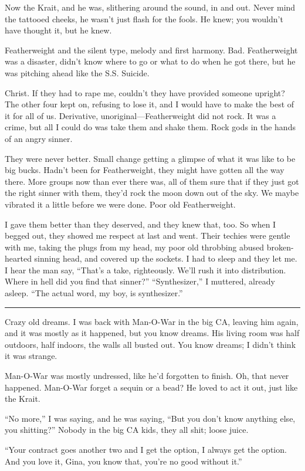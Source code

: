 Now the Krait, and he was, slithering around the sound, in and out. Never mind the tattooed cheeks, he wasn't just flash for the fools. He knew; you wouldn't have thought it, but he knew.

Featherweight and the silent type, melody and first harmony. Bad. Featherweight was a disaster, didn't know where to go or what to do when he got there, but he was pitching ahead like the S.S. Suicide.

Christ. If they had to rape me, couldn't they have provided someone upright? The other four kept on, refusing to lose it, and I would have to make the best of it for all of us. Derivative, unoriginal—Featherweight did not rock. It was a crime, but all I could do was take them and shake them. Rock gods in the hands of an angry sinner.

They were never better. Small change getting a glimpse of what it was like to be big bucks. Hadn't been for Featherweight, they might have gotten all the way there. More groups now than ever there was, all of them sure that if they just got the right sinner with them, they'd rock the moon down out of the sky.
We maybe vibrated it a little before we were done. Poor old Featherweight.

I gave them better than they deserved, and they knew that, too. So when I begged out, they showed me respect at last and went. Their techies were gentle with me, taking the plugs from my head, my poor old throbbing abused broken-hearted sinning head, and covered up the sockets. I had to sleep and they let me. I hear the man say, “That's a take, righteously. We'll rush it into distribution. Where in hell did you find that sinner?”
“Synthesizer,” I muttered, already asleep. “The actual word, my boy, is synthesizer.”

\fancybreak{* * *}

Crazy old dreams. I was back with Man-O-War in the big CA, leaving him again, and it was mostly as it happened, but you know dreams. His living room was half outdoors, half indoors, the walls all busted out. You know dreams; I didn't think it was strange.

Man-O-War was mostly undressed, like he'd forgotten to finish. Oh, that never happened. Man-O-War forget a sequin or a bead? He loved to act it out, just like the Krait.

“No more,” I was saying, and he was saying, “But you don't know anything else, you shitting?” Nobody in the big CA kids, they all shit; loose juice.

“Your contract goes another two and I get the option, I always get the option. And you love it, Gina, you know that, you're no good without it.”

